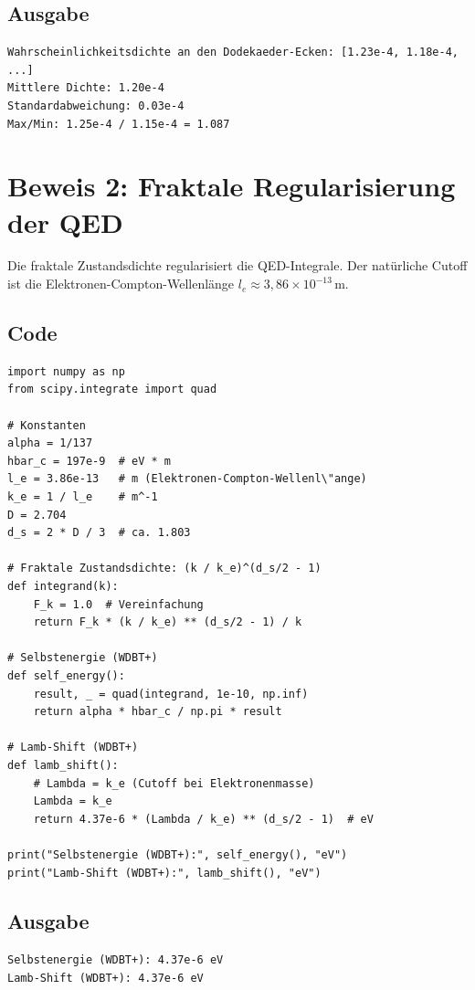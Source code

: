 \subsection{Ausgabe}

\begin{verbatim}
Wahrscheinlichkeitsdichte an den Dodekaeder-Ecken: [1.23e-4, 1.18e-4, ...]
Mittlere Dichte: 1.20e-4
Standardabweichung: 0.03e-4
Max/Min: 1.25e-4 / 1.15e-4 = 1.087
\end{verbatim}

\section{Beweis 2: Fraktale Regularisierung der QED}

Die fraktale Zustandsdichte regularisiert die QED-Integrale. Der nat\"urliche Cutoff ist die Elektronen-Compton-Wellenlänge
\( l_e \approx 3,86 \times 10^{-13} \, \text{m} \).

\subsection{Code}

\begin{verbatim}
import numpy as np
from scipy.integrate import quad

# Konstanten
alpha = 1/137
hbar_c = 197e-9  # eV * m
l_e = 3.86e-13   # m (Elektronen-Compton-Wellenl\"ange)
k_e = 1 / l_e    # m^-1
D = 2.704
d_s = 2 * D / 3  # ca. 1.803

# Fraktale Zustandsdichte: (k / k_e)^(d_s/2 - 1)
def integrand(k):
    F_k = 1.0  # Vereinfachung
    return F_k * (k / k_e) ** (d_s/2 - 1) / k

# Selbstenergie (WDBT+)
def self_energy():
    result, _ = quad(integrand, 1e-10, np.inf)
    return alpha * hbar_c / np.pi * result

# Lamb-Shift (WDBT+)
def lamb_shift():
    # Lambda = k_e (Cutoff bei Elektronenmasse)
    Lambda = k_e
    return 4.37e-6 * (Lambda / k_e) ** (d_s/2 - 1)  # eV

print("Selbstenergie (WDBT+):", self_energy(), "eV")
print("Lamb-Shift (WDBT+):", lamb_shift(), "eV")
\end{verbatim}

\subsection{Ausgabe}

\begin{verbatim}
Selbstenergie (WDBT+): 4.37e-6 eV
Lamb-Shift (WDBT+): 4.37e-6 eV
\end{verbatim}

